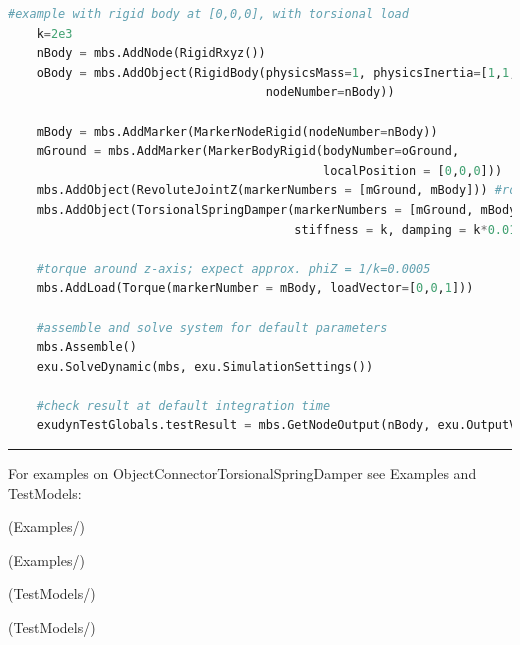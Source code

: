\begin{lstlisting}[language=Python, firstnumber=1]
    #example with rigid body at [0,0,0], with torsional load
    k=2e3
    nBody = mbs.AddNode(RigidRxyz())
    oBody = mbs.AddObject(RigidBody(physicsMass=1, physicsInertia=[1,1,1,0,0,0], 
                                    nodeNumber=nBody))
    
    mBody = mbs.AddMarker(MarkerNodeRigid(nodeNumber=nBody))
    mGround = mbs.AddMarker(MarkerBodyRigid(bodyNumber=oGround, 
                                            localPosition = [0,0,0]))
    mbs.AddObject(RevoluteJointZ(markerNumbers = [mGround, mBody])) #rotation around ground Z-axis
    mbs.AddObject(TorsionalSpringDamper(markerNumbers = [mGround, mBody], 
                                        stiffness = k, damping = k*0.01, offset = 0))

    #torque around z-axis; expect approx. phiZ = 1/k=0.0005
    mbs.AddLoad(Torque(markerNumber = mBody, loadVector=[0,0,1])) 

    #assemble and solve system for default parameters
    mbs.Assemble()
    exu.SolveDynamic(mbs, exu.SimulationSettings())
    
    #check result at default integration time
    exudynTestGlobals.testResult = mbs.GetNodeOutput(nBody, exu.OutputVariableType.Rotation)[2]

\end{lstlisting}

\vspace{6pt}\par\noindent\rule{\textwidth}{0.4pt}
%
\noindent For examples on ObjectConnectorTorsionalSpringDamper see Examples and TestModels:
\bi
\item {} (Examples/)
\item {} (Examples/)
\item {} (TestModels/)
\item {} (TestModels/)
\ei

%
\newpage

